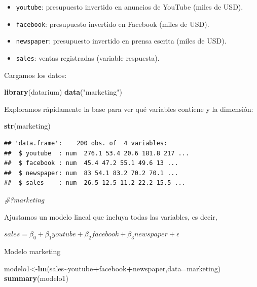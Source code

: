 \documentclass[
]{book}
\newenvironment{Shaded}{\begin{snugshade}}{\end{snugshade}}
\newcommand{\AttributeTok}[1]{\textcolor[rgb]{0.13,0.29,0.53}{#1}}
\newcommand{\CommentTok}[1]{\textcolor[rgb]{0.56,0.35,0.01}{\textit{#1}}}
\newcommand{\FunctionTok}[1]{\textcolor[rgb]{0.13,0.29,0.53}{\textbf{#1}}}
\newcommand{\NormalTok}[1]{#1}
\newcommand{\OtherTok}[1]{\textcolor[rgb]{0.56,0.35,0.01}{#1}}
\newcommand{\SpecialCharTok}[1]{\textcolor[rgb]{0.81,0.36,0.00}{\textbf{#1}}}
\newcommand{\StringTok}[1]{\textcolor[rgb]{0.31,0.60,0.02}{#1}}
\providecommand{\tightlist}{%
  \setlength{\itemsep}{0pt}\setlength{\parskip}{0pt}}
\begin{document}
\begin{itemize}
\tightlist
\item
  \texttt{youtube}: presupuesto invertido en anuncios de YouTube (miles de USD).
\item
  \texttt{facebook}: presupuesto invertido en Facebook (miles de USD).
\item
  \texttt{newspaper}: presupuesto invertido en prensa escrita (miles de USD).
\item
  \texttt{sales}: ventas registradas (variable respuesta).
\end{itemize}

Cargamos los datos:

\begin{Shaded}
\begin{Highlighting}[]
\FunctionTok{library}\NormalTok{(datarium)}
\FunctionTok{data}\NormalTok{(}\StringTok{"marketing"}\NormalTok{)}
\end{Highlighting}
\end{Shaded}

Exploramos rápidamente la base para ver qué variables contiene y la dimensión:

\begin{Shaded}
\begin{Highlighting}[]
\FunctionTok{str}\NormalTok{(marketing)}
\end{Highlighting}
\end{Shaded}

\begin{verbatim}
## 'data.frame':    200 obs. of  4 variables:
##  $ youtube  : num  276.1 53.4 20.6 181.8 217 ...
##  $ facebook : num  45.4 47.2 55.1 49.6 13 ...
##  $ newspaper: num  83 54.1 83.2 70.2 70.1 ...
##  $ sales    : num  26.5 12.5 11.2 22.2 15.5 ...
\end{verbatim}

\begin{Shaded}
\begin{Highlighting}[]
\CommentTok{\#?marketing}
\end{Highlighting}
\end{Shaded}

Ajustamos un modelo lineal que incluya todas las variables, es decir,

\(sales=\beta_0+\beta_1 youtube+\beta_2 facebook+ \beta_3 newspaper+\epsilon\)

Modelo marketing

\begin{Shaded}
\begin{Highlighting}[]
\NormalTok{modelo1}\OtherTok{\textless{}{-}}\FunctionTok{lm}\NormalTok{(sales}\SpecialCharTok{\textasciitilde{}}\NormalTok{youtube}\SpecialCharTok{+}\NormalTok{facebook}\SpecialCharTok{+}\NormalTok{newspaper,}\AttributeTok{data=}\NormalTok{marketing)}
\FunctionTok{summary}\NormalTok{(modelo1)}
\end{Highlighting}
\end{Shaded}
\end{document}
